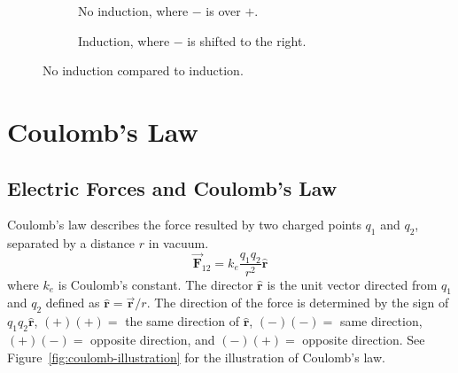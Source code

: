 \begin{figure}[H]
     \centering
     \begin{subfigure}[b]{0.4\textwidth}
         \centering
         \caption{No induction, where $-$ is over $+$.}
         \label{fig:y equals x}
     \end{subfigure}
     \hfill
     \begin{subfigure}[b]{0.4\textwidth}
         \centering
         \caption{Induction, where $-$ is shifted to the right.}
         \label{fig:three sin x}
     \end{subfigure}
        \caption{No induction compared to induction.}
        \label{fig:three graphs}
\end{figure}

\section{Coulomb's Law}
\subsection{Electric Forces and Coulomb's Law}
Coulomb's law describes the force resulted by two charged points $q_1$ and $q_2$, separated by a distance $r$ in vacuum.
\begin{equation}
  \vec{\boldsymbol{F}}_{12} = k_e \frac{q_1q_2}{r^2}\hat{\boldsymbol{r}}
\end{equation}
where $k_e$ is Coulomb's constant. The director $\hat{\boldsymbol{r}}$ is the unit vector directed from $q_1$ and $q_2$ defined as $\hat{\boldsymbol{r}}=\vec{\boldsymbol{r}}/r$. The direction of the force is determined by the sign of $q_1q_2\hat{\boldsymbol{r}}$, $(+)(+)=$ the same direction of $\hat{\boldsymbol{r}}$, $(-)(-)=$ same direction, $(+)(-)=$ opposite direction, and $(-)(+)=$ opposite direction.
See Figure~\ref{fig:coulomb-illustration} for the illustration of Coulomb's law.

